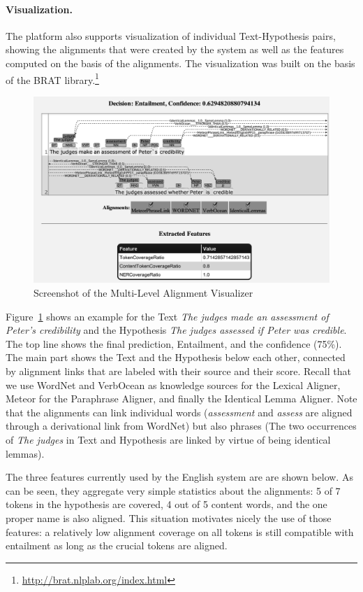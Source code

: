\documentclass[11pt,a4paper]{article}
\begin{document}
\paragraph{Visualization.}

The platform also supports visualization of individual Text-Hypothesis
pairs, showing the alignments that were created by the system as well
as the features computed on the basis of the alignments. The
visualization was built on the basis of the BRAT
library.\footnote{\url{http://brat.nlplab.org/index.html}}

\begin{figure}[t]
  \centering
\includegraphics[width=\textwidth]{ScreenshotGray}  
  \caption{Screenshot of the Multi-Level Alignment Visualizer}
  \label{fig:screenshot}
\end{figure}


Figure~\ref{fig:screenshot} shows an example for the Text \textit{The
  judges made an assessment of Peter's credibility} and the Hypothesis
\textit{The judges assessed if Peter was credible}. The top line shows
the final prediction, Entailment, and the confidence (75\%). The main
part shows the Text and the Hypothesis below each other, connected by
alignment links that are labeled with their source and their
score. Recall that we use WordNet and VerbOcean as knowledge sources
for the Lexical Aligner, Meteor for the Paraphrase Aligner, and
finally the Identical Lemma Aligner. Note that the alignments can link
individual words (\textit{assessment} and \textit{assess} are aligned
through a derivational link from WordNet) but also phrases (The two
occurrences of \textit{The judges} in Text and Hypothesis are linked
by virtue of being identical lemmas). 

The three features currently used by the English system are are shown
below. As can be seen, they aggregate very simple statistics about the
alignments: 5 of 7 tokens in the hypothesis are covered, 4 out of 5
content words, and the one proper name is also aligned. This situation
motivates nicely the use of those features: a relatively low alignment
coverage on all tokens is still compatible with entailment as long as
the crucial tokens are aligned. 
\end{document}
